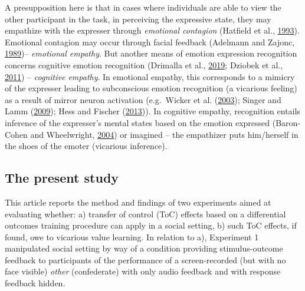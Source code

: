 \documentclass[]{elsarticle} %
\begin{document}
A presupposition here is that in cases where individuals are able to
view the other participant in the task, in perceiving the expressive
state, they may empathize with the expresser through \emph{emotional
contagion} (Hatfield et al.,
\protect\hyperlink{ref-hatfield1993emotional}{1993}). Emotional
contagion may occur through facial feedback (Adelmann and Zajonc,
\protect\hyperlink{ref-adelmann1989facial}{1989})-- \emph{emotional
empathy}. But another means of emotion expression recognition concerns
cognitive emotion recognition (Drimalla et al.,
\protect\hyperlink{ref-drimalla2019face}{2019}; Dziobek et al.,
\protect\hyperlink{ref-dziobek2011neuronal}{2011}) -- \emph{cognitive
empathy}. In emotional empathy, this corresponds to a mimicry of the
expresser leading to subconscious emotion recognition (a vicarious
feeling) as a result of mirror neuron activation (e.g.~Wicker et al.
(\protect\hyperlink{ref-wicker2003both}{2003}); Singer and Lamm
(\protect\hyperlink{ref-singer2009social}{2009}); Hess and Fischer
(\protect\hyperlink{ref-hess2013emotional}{2013})). In cognitive
empathy, recognition entails inference of the expresser's mental states
based on the emotion expressed (Baron-Cohen and Wheelwright,
\protect\hyperlink{ref-baron2004empathy}{2004}) or imagined -- the
empathizer puts him/herself in the shoes of the emoter (vicarious
inference).

\hypertarget{the-present-study}{%
\subsection{The present study}\label{the-present-study}}

This article reports the method and findings of two experiments aimed at
evaluating whether: a) transfer of control (ToC) effects based on a
differential outcomes training procedure can apply in a social setting,
b) such ToC effects, if found, owe to vicarious value learning. In
relation to a), Experiment 1 manipulated social setting by way of a
condition providing stimulus-outcome feedback to participants of the
performance of a screen-recorded (but with no face visible) \emph{other}
(confederate) with only audio feedback and with response feedback
hidden.
\end{document}
